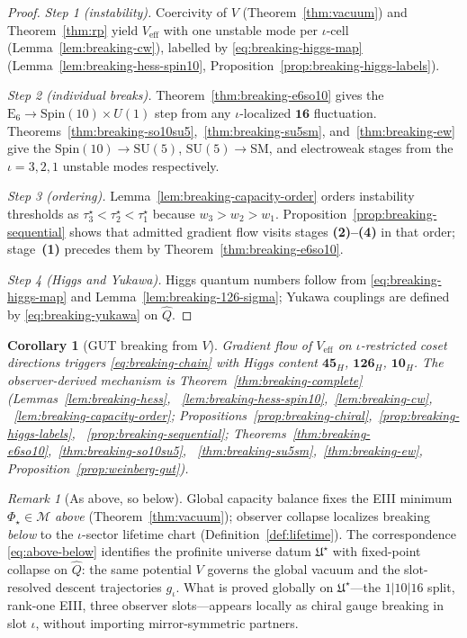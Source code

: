 \documentclass[aps,prd,onecolumn,amsmath,amssymb,nofootinbib,11pt]{revtex4-2}
\numberwithin{equation}{section}
\theoremstyle{plain}
\newtheorem{corollary}[theorem]{Corollary}
\theoremstyle{definition}
\theoremstyle{remark}
\newtheorem{remark}[theorem]{Remark}
\newcommand{\E}[1]{\mathrm{E}_{#1}}
\newcommand{\Spin}{\mathrm{Spin}}
\newcommand{\orderparam}{\Phi}
\begin{document}
\begin{proof}
\emph{Step 1 (instability).} Coercivity of $V$ (Theorem~\ref{thm:vacuum})
and Theorem~\ref{thm:rp} yield $V_{\mathrm{eff}}$ with one unstable mode per
$\iota$-cell (Lemma~\ref{lem:breaking-cw}), labelled by
\eqref{eq:breaking-higgs-map} (Lemma~\ref{lem:breaking-hess-spin10},
Proposition~\ref{prop:breaking-higgs-labels}).

\emph{Step 2 (individual breaks).} Theorem~\ref{thm:breaking-e6so10} gives
the $\E{6}\to\Spin(10)\times U(1)$ step from any $\iota$-localized $\mathbf{16}$
fluctuation. Theorems~\ref{thm:breaking-so10su5},~\ref{thm:breaking-su5sm},
and~\ref{thm:breaking-ew} give the $\Spin(10)\to\mathrm{SU}(5)$,
$\mathrm{SU}(5)\to$SM, and electroweak stages from the $\iota=3,2,1$ unstable
modes respectively.

\emph{Step 3 (ordering).} Lemma~\ref{lem:breaking-capacity-order} orders
instability thresholds as $\tau_3^\star<\tau_2^\star<\tau_1^\star$ because
$w_3>w_2>w_1$. Proposition~\ref{prop:breaking-sequential} shows that admitted
gradient flow visits stages \textbf{(2)--(4)} in that order; stage~\textbf{(1)}
precedes them by Theorem~\ref{thm:breaking-e6so10}.

\emph{Step 4 (Higgs and Yukawa).} Higgs quantum numbers follow from
\eqref{eq:breaking-higgs-map} and Lemma~\ref{lem:breaking-126-sigma}; Yukawa
couplings are defined by \eqref{eq:breaking-yukawa} on $\hat Q$.
\end{proof}

\begin{corollary}[GUT breaking from $V$]\label{cor:breaking}
Gradient flow of $V_{\mathrm{eff}}$ on $\iota$-restricted coset directions
triggers \eqref{eq:breaking-chain} with Higgs content $\mathbf{45}_H$,
$\mathbf{126}_H$, $\mathbf{10}_H$. The observer-derived mechanism is
Theorem~\ref{thm:breaking-complete} (Lemmas~\ref{lem:breaking-hess},
~\ref{lem:breaking-hess-spin10},~\ref{lem:breaking-cw},
~\ref{lem:breaking-capacity-order};
Propositions~\ref{prop:breaking-chiral},~\ref{prop:breaking-higgs-labels},
~\ref{prop:breaking-sequential};
Theorems~\ref{thm:breaking-e6so10},~\ref{thm:breaking-so10su5},
~\ref{thm:breaking-su5sm},~\ref{thm:breaking-ew},
Proposition~\ref{prop:weinberg-gut}).
\end{corollary}

\begin{remark}[As above, so below]\label{rem:breaking-above-below}
Global capacity balance fixes the EIII minimum $\orderparam_\star\in\mathcal{M}$
\emph{above} (Theorem~\ref{thm:vacuum}); observer collapse localizes breaking
\emph{below} to the $\iota$-sector lifetime chart
(Definition~\ref{def:lifetime}). The correspondence \eqref{eq:above-below}
identifies the profinite universe datum $\mathfrak{U}^\star$ with fixed-point
collapse on $\hat Q$: the same potential $V$ governs the global vacuum and the
slot-resolved descent trajectories $g_\iota$. What is proved globally on
$\mathfrak{U}^\star$---the $1|10|16$ split, rank-one EIII, three observer
slots---appears locally as chiral gauge breaking in slot $\iota$, without
importing mirror-symmetric partners.
\end{remark}
\end{document}
